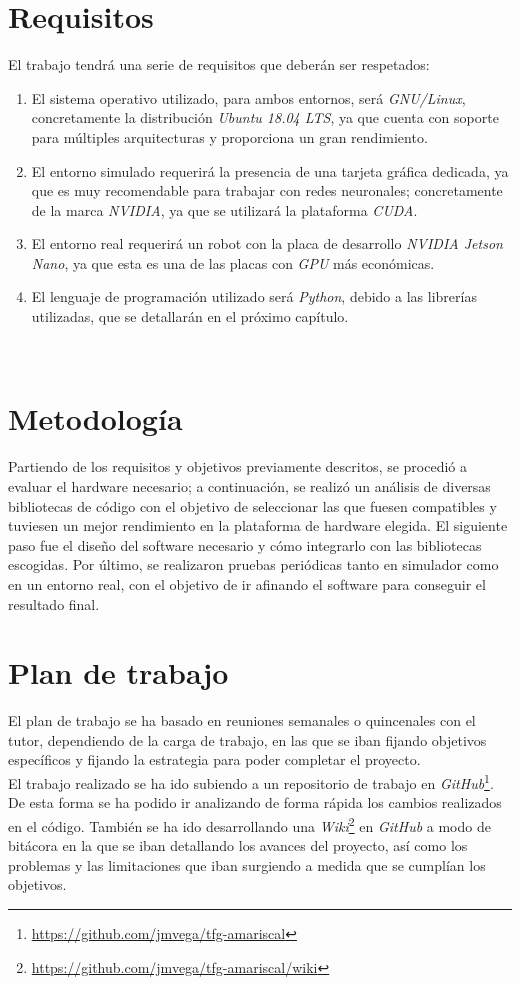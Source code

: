 \section{Requisitos}
\label{sec:requisitos}
El trabajo tendrá una serie de requisitos que deberán ser respetados:
\begin{enumerate}
	\item El sistema operativo utilizado, para ambos entornos, será \textit{GNU/Linux}, concretamente la distribución \textit{Ubuntu 18.04 LTS}, ya que cuenta con soporte para múltiples arquitecturas y proporciona un gran rendimiento.
	\item El entorno simulado requerirá la presencia de una tarjeta gráfica dedicada, ya que es muy recomendable para trabajar con redes neuronales; concretamente de la marca \textit{NVIDIA}, ya que se utilizará la plataforma \textit{CUDA}.
	\item El entorno real requerirá un robot con la placa de desarrollo \textit{NVIDIA Jetson Nano}, ya que esta es una de las placas con \textit{GPU} más económicas.
	\item El lenguaje de programación utilizado será \textit{Python}, debido a las librerías utilizadas, que se detallarán en el próximo capítulo.
\end{enumerate}\

\section{Metodología}
\label{sec:metodologia}
Partiendo de los requisitos y objetivos previamente descritos, se procedió a evaluar el hardware necesario; a continuación, se realizó un análisis de diversas bibliotecas de código con el objetivo de seleccionar las que fuesen compatibles y tuviesen un mejor rendimiento en la plataforma de hardware elegida. El siguiente paso fue el diseño del software necesario y cómo integrarlo con las bibliotecas escogidas. Por último, se realizaron pruebas periódicas tanto en simulador como en un entorno real, con el objetivo de ir afinando el software para conseguir el resultado final.\\

\section{Plan de trabajo}
\label{sec:plantrabajo}

El plan de trabajo se ha basado en reuniones semanales o quincenales con el tutor, dependiendo de la carga de trabajo, en las que se iban fijando objetivos específicos y fijando la estrategia para poder completar el proyecto.\\

El trabajo realizado se ha ido subiendo a un repositorio de trabajo en \textit{GitHub}\footnote{\url{https://github.com/jmvega/tfg-amariscal}}. De esta forma se ha podido ir analizando de forma rápida los cambios realizados en el código. También se ha ido desarrollando una \textit{Wiki}\footnote{\url{https://github.com/jmvega/tfg-amariscal/wiki}} en \textit{GitHub} a modo de bitácora en la que se iban detallando los avances del proyecto, así como los problemas y las limitaciones que iban surgiendo a medida que se cumplían los objetivos.\\
